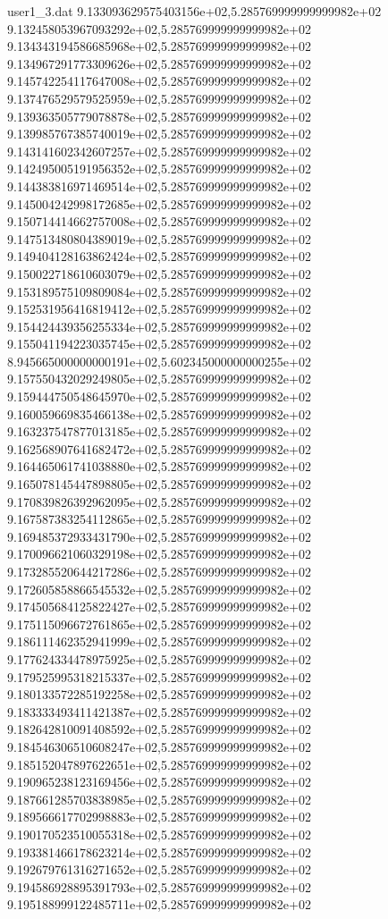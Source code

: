 \begin{filecontents}{user1_3.dat}
9.133093629575403156e+02,5.285769999999999982e+02
9.132458053967093292e+02,5.285769999999999982e+02
9.134343194586685968e+02,5.285769999999999982e+02
9.134967291773309626e+02,5.285769999999999982e+02
9.145742254117647008e+02,5.285769999999999982e+02
9.137476529579525959e+02,5.285769999999999982e+02
9.139363505779078878e+02,5.285769999999999982e+02
9.139985767385740019e+02,5.285769999999999982e+02
9.143141602342607257e+02,5.285769999999999982e+02
9.142495005191956352e+02,5.285769999999999982e+02
9.144383816971469514e+02,5.285769999999999982e+02
9.145004242998172685e+02,5.285769999999999982e+02
9.150714414662757008e+02,5.285769999999999982e+02
9.147513480804389019e+02,5.285769999999999982e+02
9.149404128163862424e+02,5.285769999999999982e+02
9.150022718610603079e+02,5.285769999999999982e+02
9.153189575109809084e+02,5.285769999999999982e+02
9.152531956416819412e+02,5.285769999999999982e+02
9.154424439356255334e+02,5.285769999999999982e+02
9.155041194223035745e+02,5.285769999999999982e+02
8.945665000000000191e+02,5.602345000000000255e+02
9.157550432029249805e+02,5.285769999999999982e+02
9.159444750548645970e+02,5.285769999999999982e+02
9.160059669835466138e+02,5.285769999999999982e+02
9.163237547877013185e+02,5.285769999999999982e+02
9.162568907641682472e+02,5.285769999999999982e+02
9.164465061741038880e+02,5.285769999999999982e+02
9.165078145447898805e+02,5.285769999999999982e+02
9.170839826392962095e+02,5.285769999999999982e+02
9.167587383254112865e+02,5.285769999999999982e+02
9.169485372933431790e+02,5.285769999999999982e+02
9.170096621060329198e+02,5.285769999999999982e+02
9.173285520644217286e+02,5.285769999999999982e+02
9.172605858866545532e+02,5.285769999999999982e+02
9.174505684125822427e+02,5.285769999999999982e+02
9.175115096672761865e+02,5.285769999999999982e+02
9.186111462352941999e+02,5.285769999999999982e+02
9.177624334478975925e+02,5.285769999999999982e+02
9.179525995318215337e+02,5.285769999999999982e+02
9.180133572285192258e+02,5.285769999999999982e+02
9.183333493411421387e+02,5.285769999999999982e+02
9.182642810091408592e+02,5.285769999999999982e+02
9.184546306510608247e+02,5.285769999999999982e+02
9.185152047897622651e+02,5.285769999999999982e+02
9.190965238123169456e+02,5.285769999999999982e+02
9.187661285703838985e+02,5.285769999999999982e+02
9.189566617702998883e+02,5.285769999999999982e+02
9.190170523510055318e+02,5.285769999999999982e+02
9.193381466178623214e+02,5.285769999999999982e+02
9.192679761316271652e+02,5.285769999999999982e+02
9.194586928895391793e+02,5.285769999999999982e+02
9.195188999122485711e+02,5.285769999999999982e+02

\end{filecontents}
